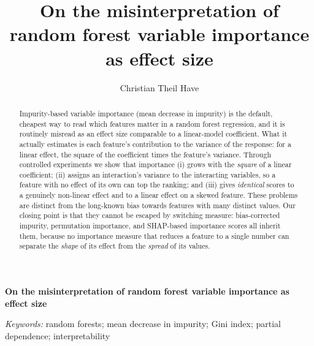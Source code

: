 \documentclass[12pt]{article}
\begin{document}
\def\spacingset#1{\renewcommand{\baselinestretch}%
{#1}\small\normalsize} \spacingset{1}


\anon
{
  \title{On the misinterpretation of random forest variable importance as effect size}
  \author{Christian Theil Have}
  \maketitle
} \fi

\anon
{
  \bigskip
  \bigskip
  \bigskip
  \begin{center}
    {\LARGE\bf On the misinterpretation of random forest variable importance as effect size}
  \end{center}
  \medskip
} \fi

\bigskip
\begin{abstract}
Impurity-based variable importance (mean decrease in impurity) is the default,
cheapest way to read which features matter in a random forest regression, and it
is routinely misread as an effect size comparable to a linear-model coefficient.
What it actually estimates is each feature's contribution to the variance of the
response: for a linear effect, the square of the coefficient times the feature's
variance. Through controlled experiments we show that importance (i) grows with
the \emph{square} of a linear coefficient; (ii) assigns an interaction's
variance to the interacting variables, so a feature with no effect of its own
can top the ranking; and (iii) gives \emph{identical} scores to a genuinely
non-linear effect and to a linear effect on a skewed feature. These problems are
distinct from the long-known bias towards features with many distinct values.
Our closing point is that they cannot be escaped by switching measure:
bias-corrected impurity, permutation importance, and SHAP-based importance
scores all inherit them, because no importance measure that reduces a feature to
a single number can separate the \emph{shape} of its effect from the
\emph{spread} of its values.
\end{abstract}

\noindent%
{\it Keywords:} random forests; mean decrease in impurity; Gini index;
partial dependence; interpretability
\vfill

\newpage
\spacingset{2}








\end{document}
